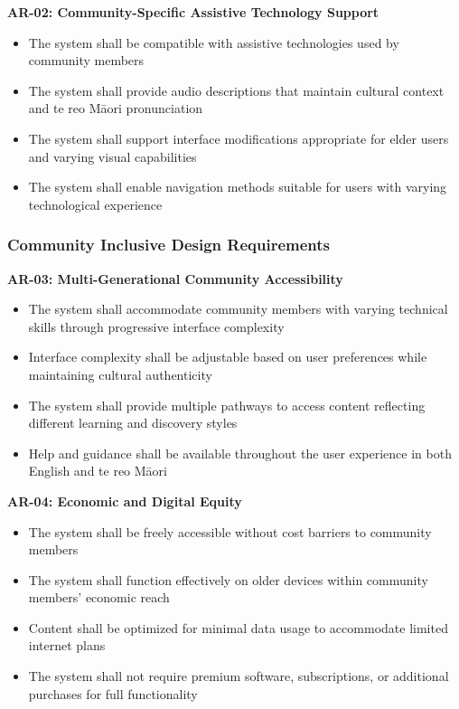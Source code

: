 \textbf{AR-02: Community-Specific Assistive Technology Support}
\begin{itemize}
    \item The system shall be compatible with assistive technologies used by community members
    \item The system shall provide audio descriptions that maintain cultural context and te reo M\=aori pronunciation
    \item The system shall support interface modifications appropriate for elder users and varying visual capabilities
    \item The system shall enable navigation methods suitable for users with varying technological experience
\end{itemize}

\subsubsection{Community Inclusive Design Requirements}
\label{subsubsec:community_inclusive_design}

\textbf{AR-03: Multi-Generational Community Accessibility}
\begin{itemize}
    \item The system shall accommodate community members with varying technical skills through progressive interface complexity
    \item Interface complexity shall be adjustable based on user preferences while maintaining cultural authenticity
    \item The system shall provide multiple pathways to access content reflecting different learning and discovery styles
    \item Help and guidance shall be available throughout the user experience in both English and te reo M\=aori
\end{itemize}

\textbf{AR-04: Economic and Digital Equity}
\begin{itemize}
    \item The system shall be freely accessible without cost barriers to community members
    \item The system shall function effectively on older devices within community members' economic reach
    \item Content shall be optimized for minimal data usage to accommodate limited internet plans
    \item The system shall not require premium software, subscriptions, or additional purchases for full functionality
\end{itemize}

